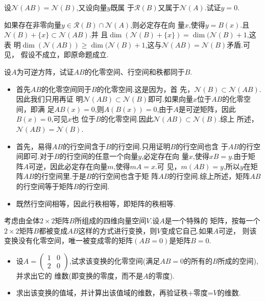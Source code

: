 ﻿\documentclass{book} \usepackage{exsheets} \usepackage{xeCJK}
\begin{document}
\begin{question}
  设$\mathcal{N}(AB)=\mathcal{N}(B)$,又设向量$y$既属
  于$\mathcal{R}(B)$又属于$\mathcal{N}(A)$.试证$y=0$.
\end{question}
\begin{solution}
  如果存在非零向量$y\in \mathcal{R}(B)\cap \mathcal{N}(A)$,则必定存在向
  量$x$,使得$y=B(x)$.且$\mathcal{N}(B)+\{x\}\subset \mathcal{N}(AB)$.并
  且$\dim (\mathcal{N}(B)+\{x\})=\dim (\mathcal{N}(B)+1$,这表
  明$\dim(\mathcal{N}(AB))\geq
  \dim(\mathcal{N}(B)+1$,这与$\mathcal{N}(AB)=\mathcal{N}(B)$矛盾.可见，
  假设不成立，即原命题成立.
\end{solution}
\begin{question}
  设$A$为可逆方阵，试证$AB$的化零空间、行空间和秩都同于$B$.
\end{question}
\begin{solution}
  \begin{itemize}
  \item 首先$AB$的化零空间同于$B$的化零空间.这是因为，首
    先，$\mathcal{N}(B)\subset \mathcal{N}(AB)$.因此我们只用再证
    明$\mathcal{N}(AB)\subset
    \mathcal{N}(B)$即可.如果向量$x$位于$AB$的化零空间，即满
    足$AB(x)=0$,则$A(B(x))=0$,由于$A$是可逆矩阵，因此$B(x)=0$,可见$x$也
    位于$B$的化零空间.因此$\mathcal{N}(AB)\subset \mathcal{N}(B)$.综上
    所述，$\mathcal{N}(AB)=\mathcal{N}(B)$.
  \item
    首先，易得$AB$的行空间含于$B$的行空间.只用证明$B$的行空间也含
    于$AB$的行空间即可.对于$B$的行空间的任意一个向量$y$,必定存在向
    量$x$,使得$xB=y$.由于矩阵$A$可逆，因此必定存在向量$m$,使得$mA=x$.可
    见，$m(AB)=y$,所以$y$在矩阵$AB$的行空间里.于是$B$的行空间也含于矩
    阵$AB$的行空间.综上所述，矩阵$AB$的行空间等于矩阵$B$的行空间.
  \item 既然行空间相等，因此行秩相等，即矩阵的秩相等.
  \end{itemize}
\end{solution}
\begin{question}
  考虑由全体$2\times 2$矩阵$B$所组成的四维向量空间$V$.设$A$是一个特殊的
  矩阵，按每一个$2\times
  2$矩阵$B$都被变成$AB$这样的方式进行变换，则$V$变成它自己.如果$A$可逆，
  则该变换没有化零空间，唯一被变成零的矩阵$(AB=0)$是矩阵$B=0$.
  \begin{itemize}
  \item 设$A=
    \begin{pmatrix}
      1&0\\
      2&0
    \end{pmatrix}
    $,试求该变换的化零空间(满足$AB=0$的所有的$B$所成的空间),并求出它的
    维数(即变换的零度，而不是$A$的零度).
  \item 求出该变换的值域，并计算出该值域的维数，再验证秩+零度=$V$的维数.
  \end{itemize}
\end{question}
\end{document}
